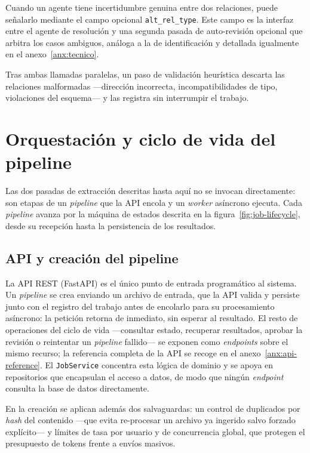 Cuando un agente tiene incertidumbre genuina entre dos relaciones, puede señalarlo mediante el
campo opcional \texttt{alt\_rel\_type}. Este campo es la interfaz entre el agente de resolución
y una segunda pasada de auto-revisión opcional que arbitra los casos ambiguos, análoga a la de
identificación y detallada igualmente en el anexo~\ref{anx:tecnico}.

Tras ambas llamadas paralelas, un paso de validación heurística descarta las relaciones
malformadas —dirección incorrecta, incompatibilidades de tipo, violaciones del esquema— y las
registra sin interrumpir el trabajo.

\section{Orquestación y ciclo de vida del pipeline}
\label{sec:orquestacion}

Las dos pasadas de extracción descritas hasta aquí no se invocan directamente: son etapas de un
\textit{pipeline} que la \ac{API} encola y un \textit{worker} asíncrono ejecuta. Cada \textit{pipeline}
avanza por la máquina de estados descrita en la figura~\ref{fig:job-lifecycle}, desde su recepción
hasta la persistencia de los resultados.

\subsection{API y creación del pipeline}

La \ac{API} REST (FastAPI) es el único punto de entrada programático al sistema. Un \textit{pipeline}
se crea enviando un archivo de entrada, que la \ac{API} valida y persiste junto con el registro del
trabajo antes de encolarlo para su procesamiento asíncrono: la petición retorna de inmediato, sin
esperar al resultado. El resto de operaciones del ciclo de vida —consultar estado, recuperar
resultados, aprobar la revisión o reintentar un \textit{pipeline} fallido— se exponen como
\textit{endpoints} sobre el mismo recurso; la referencia completa de la \ac{API} se recoge en el
anexo~\ref{anx:api-reference}. El \texttt{JobService} concentra esta lógica de dominio y se apoya
en repositorios que encapsulan el acceso a datos, de modo que ningún \textit{endpoint} consulta la
base de datos directamente.

En la creación se aplican además dos salvaguardas: un control de duplicados por
\textit{hash} del contenido —que evita re-procesar un archivo ya ingerido salvo forzado
explícito— y límites de tasa por usuario y de concurrencia global, que protegen el presupuesto
de tokens frente a envíos masivos.

